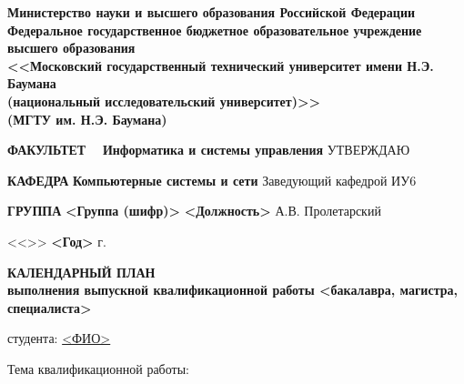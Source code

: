 \documentclass[14pt, left=25mm, right=15mm, top=20mm, bottom=10mm]{templateTaskBMSTU}
\begin{document}
	\thispagestyle{empty}

	\begin{center}
		\fontsize{12pt}{0.3\baselineskip}\selectfont 
		\textbf{Министерство науки и высшего образования Российской Федерации
		\\ Федеральное государственное бюджетное образовательное учреждение
		\\ высшего образования
		\\ <<Московский государственный технический университет имени Н.Э. Баумана
		\\ (национальный исследовательский университет)>>
		\\ (МГТУ им. Н.Э. Баумана)}

		\fontsize{12pt}{0.5\baselineskip}\selectfont
		\noindent \makebox[\linewidth]{\rule{\textwidth}{4pt}} \makebox[\linewidth]{\rule{\textwidth}{1pt}}
	\end{center}

	\begin{flushleft}
		\fontsize{12pt}{\baselineskip}\selectfont \textbf{ФАКУЛЬТЕТ} \ \ \textbf{Информатика и системы управления} \hfill УТВЕРЖДАЮ

		\textbf{КАФЕДРА} \hspace{4.6mm} \textbf{Компьютерные системы и сети} \hfill Заведующий кафедрой ИУ6

		\textbf{ГРУППА} \hspace{7mm} \textbf{<Группа (шифр)>} \hfill \textbf{<Должность>} \uline{\hspace*{2cm}} А.В. Пролетарский

		\hfill <<\uline{\hspace*{1cm}}>> \uline{\hspace*{2.5cm}} \textbf{<Год>} г.
	\end{flushleft}

	\begin{center}
		\normalsize

		\textbf{КАЛЕНДАРНЫЙ ПЛАН \\ выполнения выпускной квалификационной работы <бакалавра, магистра, специалиста>}

		студента: \uline{\hfill<ФИО>\hfill}
	\end{center}

	\begin{flushleft}
		\fontsize{12pt}{\baselineskip}\selectfont Тема квалификационной работы: \uline{\hfill} \\ \uline{\hfill}
	\end{flushleft}
\end{document}

